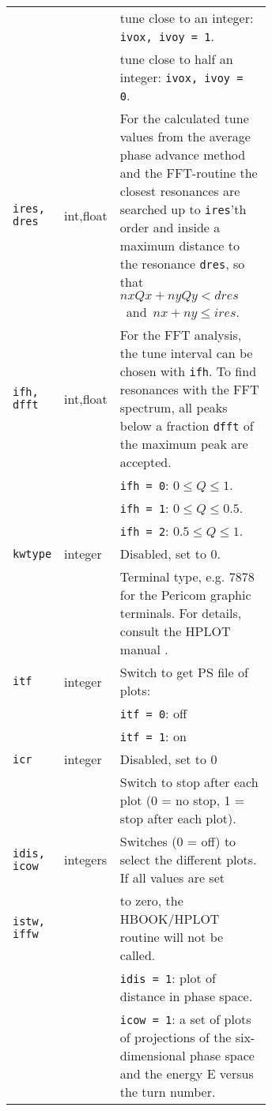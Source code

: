 \begin{longtabu}{@{}llp{0.65\linewidth}}
                          &          & tune close to an integer: \texttt{ivox, ivoy = 1}. \\
                          &          & tune close to half an integer: \texttt{ivox, ivoy = 0}. \\
    \texttt{ires, dres}   & int,float& For the calculated tune values from the average phase advance method and the FFT-routine the closest resonances are searched up to \texttt{ires}'th order and inside a maximum distance to the resonance \texttt{dres}, so that \mbox{$nx Qx + ny Qy < dres $ and $ nx + ny \le ires $.} \\
    \texttt{ifh, dfft}    & int,float& For the FFT analysis, the tune interval can be chosen with \texttt{ifh}. To find resonances with the FFT spectrum, all peaks below a fraction \texttt{dfft} of the maximum peak are accepted. \\
                          &          & \texttt{ifh = 0}: $0 \le Q \le 1$. \\
                          &          & \texttt{ifh = 1}: $0 \le Q \le 0.5$. \\
                          &          & \texttt{ifh = 2}: $0.5 \le Q \le 1$. \\
    \texttt{kwtype}       & integer  & \textcolor{notered}{Disabled, set to 0.} \\
                          &          & Terminal type, e.g. 7878 for the Pericom graphic terminals. For details, consult the HPLOT manual \cite{HPLOT}. \\
    \texttt{itf}          & integer  & Switch to get PS file of plots: \\
                          &          & \texttt{itf = 0}: off \\
                          &          & \texttt{itf = 1}: on \\
    \texttt{icr}          & integer  & \textcolor{notered}{Disabled, set to 0} \\
                          &          & Switch to stop after each plot (0 = no stop, 1 = stop after each plot). \\
    \texttt{idis, icow}   & integers & Switches (0 = off) to select the different plots. If all values are set \\
    \texttt{istw, iffw}   &          & to zero, the HBOOK/HPLOT routine will not be called. \\
                          &          & \texttt{idis = 1}: plot of distance in phase space. \\
                          &          & \texttt{icow = 1}: a set of plots of projections of the six-dimensional phase space and the energy E versus the turn number. \\

\end{longtabu}
